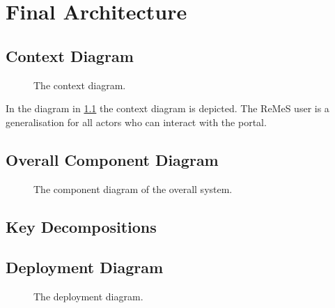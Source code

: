 \chapter{Final Architecture}
\label{chap:final-architecture}

\section{Context Diagram}

\begin{figure}[H]
	\begin{centering}
		\caption{The context diagram.}
		\label{fig:context-diagram}
	\end{centering}
\end{figure}

\npar In the diagram in \ref{fig:context-diagram} the context diagram is
depicted. The ReMeS user is a generalisation for all actors who can interact
with the portal. 

\section{Overall Component Diagram}

\begin{figure}[H]
	\begin{centering}
		\caption{The component diagram of the overall system.}
		\label{fig:overall-component-diagram}
	\end{centering}
\end{figure}

\section{Key Decompositions}

\section{Deployment Diagram}

\begin{figure}[H]
	\begin{centering}
		\caption{The deployment diagram.}
		\label{fig:deployment-diagram}
	\end{centering}
\end{figure}